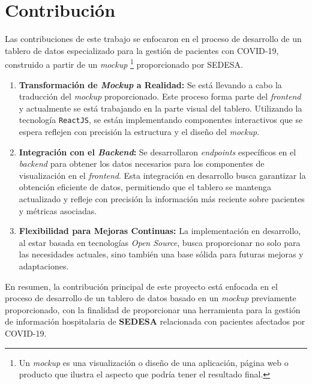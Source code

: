 \section{Contribución}\label{intro_cont}
Las contribuciones de este trabajo se enfocaron en el proceso de desarrollo de un tablero de datos especializado para la gestión de pacientes con \textsc{COVID-19}, construido a partir de un \textit{mockup} \footnote{Un \textit{mockup} es una visualización o diseño de una aplicación, página web o producto que ilustra el aspecto que podría tener el resultado final.} proporcionado por \textsc{SEDESA}. 

\begin{enumerate}
    \item \textbf{Transformación de \textit{Mockup} a Realidad:} Se está llevando a cabo la traducción del \textit{mockup} proporcionado. Este proceso forma parte del \textit{frontend} y actualmente se está trabajando en la parte visual del tablero. Utilizando la tecnología \texttt{ReactJS}, se están implementando componentes interactivos que se espera reflejen con precisión la estructura y el diseño del \textit{mockup}.

    
    \item \textbf{Integración con el \textit{Backend}:} Se desarrollaron \textit{endpoints} específicos en el \textit{backend} para obtener los datos necesarios para los componentes de visualización en el \textit{frontend}. Esta integración en desarrollo busca garantizar la obtención eficiente de datos, permitiendo que el tablero se mantenga actualizado y refleje con precisión la información más reciente sobre pacientes y métricas asociadas.
    
    \item \textbf{Flexibilidad para Mejoras Continuas:} La implementación en desarrollo, al estar basada en tecnologías \textit{Open Source}, busca proporcionar no solo para las necesidades actuales, sino también una base sólida para futuras mejoras y adaptaciones.
\end{enumerate}

En resumen, la contribución principal de este proyecto está enfocada en el proceso de desarrollo de un tablero de datos basado en un \textit{mockup} previamente proporcionado, con la finalidad de proporcionar una herramienta para la gestión de información hospitalaria de \textbf{SEDESA} relacionada con pacientes afectados por COVID-19.


